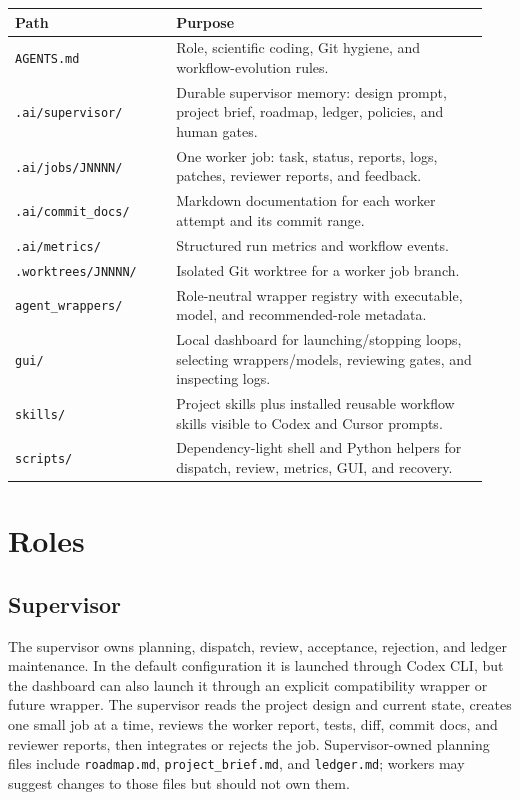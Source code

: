 \documentclass[11pt]{article}
\renewcommand{\path}[1]{\texttt{#1}}
\begin{document}
\begin{longtable}{p{0.32\linewidth}p{0.62\linewidth}}
\textbf{Path} & \textbf{Purpose}\\
\hline
\path{AGENTS.md} & Role, scientific coding, Git hygiene, and workflow-evolution rules.\\
\path{.ai/supervisor/} & Durable supervisor memory: design prompt, project brief, roadmap, ledger, policies, and human gates.\\
\path{.ai/jobs/JNNNN/} & One worker job: task, status, reports, logs, patches, reviewer reports, and feedback.\\
\path{.ai/commit\_docs/} & Markdown documentation for each worker attempt and its commit range.\\
\path{.ai/metrics/} & Structured run metrics and workflow events.\\
\path{.worktrees/JNNNN/} & Isolated Git worktree for a worker job branch.\\
\path{agent\_wrappers/} & Role-neutral wrapper registry with executable, model, and recommended-role metadata.\\
\path{gui/} & Local dashboard for launching/stopping loops, selecting wrappers/models, reviewing gates, and inspecting logs.\\
\path{skills/} & Project skills plus installed reusable workflow skills visible to Codex and Cursor prompts.\\
\path{scripts/} & Dependency-light shell and Python helpers for dispatch, review, metrics, GUI, and recovery.\\
\end{longtable}

\section{Roles}

\subsection{Supervisor}

The supervisor owns planning, dispatch, review, acceptance, rejection, and ledger
maintenance.  In the default configuration it is launched through Codex CLI, but
the dashboard can also launch it through an explicit compatibility wrapper or future
wrapper.  The supervisor reads the project design and current state, creates one
small job at a time, reviews the worker report, tests, diff, commit docs, and
reviewer reports, then integrates or rejects the job.  Supervisor-owned planning
files include \path{roadmap.md}, \path{project\_brief.md}, and \path{ledger.md};
workers may suggest changes to those files but should not own them.
\end{document}

